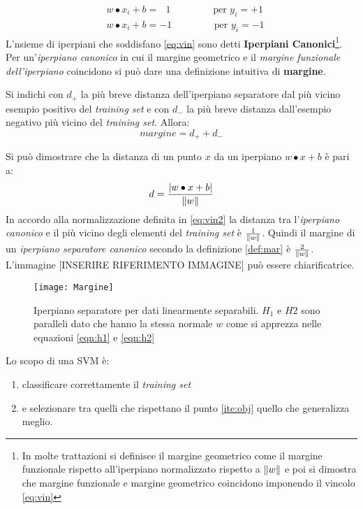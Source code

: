 \begin{align}
&w \bullet x_i + b = \:\:\:1 \qquad \qquad\text{ per } y_i = +1 \label{eqn:h1}\\
&w \bullet x_i + b = -1 \qquad \qquad\text{ per } y_i = -1  \label{eqn:h2}
\end{align}
L'nsieme di iperpiani che soddisfano \eqref{eq:vin} sono detti \textbf{Iperpiani Canonici}\footnote{In molte trattazioni si definisce il margine geometrico come il margine funzionale rispetto all'iperpiano normalizzato rispetto a $\lVert w\rVert$ e poi si dimostra che margine funzionale e margine geometrico coincidono imponendo il vincolo  \eqref{eq:vin}}.  Per un'\textit{iperpiano canonico} in cui il margine geometrico e il \textit{margine funzionale dell'iperpiano} coincidono si può dare una definizione intuitiva di \textbf{margine}.
\begin{definizione}
\label{def:mar}
Si indichi con $d_+$ la più breve distanza dell'iperpiano separatore dal più vicino esempio positivo del \textit{training set} e con $d_{-}$ la più breve distanza dall'esempio negativo più vicino del \textit{training set}. Allora:
\begin{equation*}
margine = d_{+} + d_{-}
\end{equation*}
\end{definizione}

Si può dimostrare che la distanza di un punto $x$ da un iperpiano $w \bullet x +b$ è pari a:
\begin{equation*}
d = \frac{\lvert w \bullet x + b\rvert}{\lVert w\rVert}
\end{equation*}
In accordo alla normalizzazione definita in \ref{eq:vin2} la distanza tra l'\textit{iperpiano canonico} e il più vicino degli elementi del \textit{training set} è $\frac{1}{\lVert w\rVert}$. Quindi il margine di un \textit{iperpiano separatore canonico} secondo la definizione \ref{def:mar} è $\frac{2}{\lVert w\rVert}$. L'immagine [INSERIRE RIFERIMENTO IMMAGINE] può essere chiarificatrice.\\

\begin{figure}[htp]
	\centering
	\texttt{[image: Margine]}
	\caption[Esempio iperpiano separatore]{Iperpiano separatore per dati linearmente separabili. $H_{1}$ e $H{2}$ sono paralleli dato che hanno la stessa normale $w$ come si apprezza nelle equazioni \ref{eqn:h1} e \ref{eqn:h2}}
   \label{fig:lsd}
\end{figure}

Lo scopo di una \ac{SVM} è:
\begin{enumerate}
\item \label{ite:obj}classificare correttamente il \textit{training set}
\item e selezionare tra quelli che rispettano il punto \ref{ite:obj} quello che generalizza meglio.
\end{enumerate}

